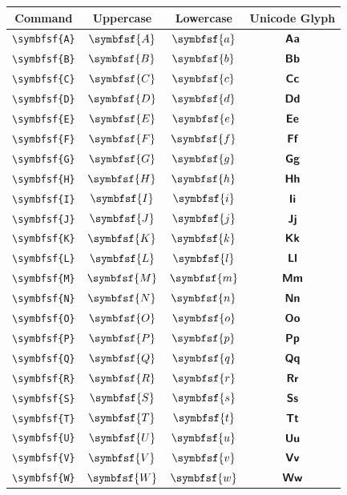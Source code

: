 \documentclass[12pt,a4paper]{article}
\begin{document}
\begin{longtable}{|c|c|c|c|}
\hline
\textbf{Command} & \textbf{Uppercase} & \textbf{Lowercase} & \textbf{Unicode Glyph} \\
\hline
\verb|\symbfsf{A}| & $\symbfsf{A}$ & $\symbfsf{a}$ & $ 𝗔 𝗮 $ \\
\verb|\symbfsf{B}| & $\symbfsf{B}$ & $\symbfsf{b}$ & $ 𝗕 𝗯 $ \\
\verb|\symbfsf{C}| & $\symbfsf{C}$ & $\symbfsf{c}$ & $ 𝗖 𝗰 $ \\
\verb|\symbfsf{D}| & $\symbfsf{D}$ & $\symbfsf{d}$ & $ 𝗗 𝗱 $ \\
\verb|\symbfsf{E}| & $\symbfsf{E}$ & $\symbfsf{e}$ & $ 𝗘 𝗲 $ \\
\verb|\symbfsf{F}| & $\symbfsf{F}$ & $\symbfsf{f}$ & $ 𝗙 𝗳 $ \\
\verb|\symbfsf{G}| & $\symbfsf{G}$ & $\symbfsf{g}$ & $ 𝗚 𝗴 $ \\
\verb|\symbfsf{H}| & $\symbfsf{H}$ & $\symbfsf{h}$ & $ 𝗛 𝗵 $ \\
\verb|\symbfsf{I}| & $\symbfsf{I}$ & $\symbfsf{i}$ & $ 𝗜 𝗶 $ \\
\verb|\symbfsf{J}| & $\symbfsf{J}$ & $\symbfsf{j}$ & $ 𝗝 𝗷 $ \\
\verb|\symbfsf{K}| & $\symbfsf{K}$ & $\symbfsf{k}$ & $ 𝗞 𝗸 $ \\
\verb|\symbfsf{L}| & $\symbfsf{L}$ & $\symbfsf{l}$ & $ 𝗟 𝗹 $ \\
\verb|\symbfsf{M}| & $\symbfsf{M}$ & $\symbfsf{m}$ & $ 𝗠 𝗺 $ \\
\verb|\symbfsf{N}| & $\symbfsf{N}$ & $\symbfsf{n}$ & $ 𝗡 𝗻 $ \\
\verb|\symbfsf{O}| & $\symbfsf{O}$ & $\symbfsf{o}$ & $ 𝗢 𝗼 $ \\
\verb|\symbfsf{P}| & $\symbfsf{P}$ & $\symbfsf{p}$ & $ 𝗣 𝗽 $ \\
\verb|\symbfsf{Q}| & $\symbfsf{Q}$ & $\symbfsf{q}$ & $ 𝗤 𝗾 $ \\
\verb|\symbfsf{R}| & $\symbfsf{R}$ & $\symbfsf{r}$ & $ 𝗥 𝗿 $ \\
\verb|\symbfsf{S}| & $\symbfsf{S}$ & $\symbfsf{s}$ & $ 𝗦 𝘀 $ \\
\verb|\symbfsf{T}| & $\symbfsf{T}$ & $\symbfsf{t}$ & $ 𝗧 𝘁 $ \\
\verb|\symbfsf{U}| & $\symbfsf{U}$ & $\symbfsf{u}$ & $ 𝗨 𝘂 $ \\
\verb|\symbfsf{V}| & $\symbfsf{V}$ & $\symbfsf{v}$ & $ 𝗩 𝘃 $ \\
\verb|\symbfsf{W}| & $\symbfsf{W}$ & $\symbfsf{w}$ & $ 𝗪 𝘄 $ \\

\end{longtable}
\end{document}
